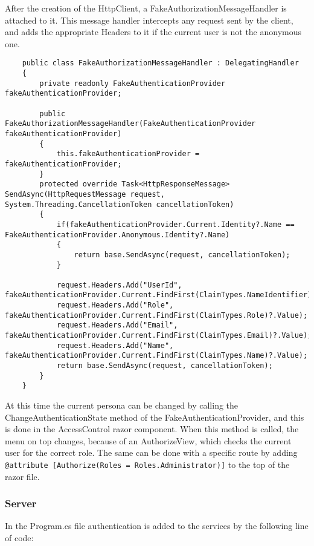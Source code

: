 After the creation of the HttpClient, a FakeAuthorizationMessageHandler is attached to it. This message handler intercepts any request sent by the client, and adds the appropriate Headers to it if the current user is not the anonymous one.

\begin{verbatim}
    public class FakeAuthorizationMessageHandler : DelegatingHandler
    {
        private readonly FakeAuthenticationProvider fakeAuthenticationProvider;
        
        public FakeAuthorizationMessageHandler(FakeAuthenticationProvider fakeAuthenticationProvider)
        {
            this.fakeAuthenticationProvider = fakeAuthenticationProvider;
        }
        protected override Task<HttpResponseMessage> SendAsync(HttpRequestMessage request, System.Threading.CancellationToken cancellationToken)
        {
            if(fakeAuthenticationProvider.Current.Identity?.Name == FakeAuthenticationProvider.Anonymous.Identity?.Name)
            {
                return base.SendAsync(request, cancellationToken);
            }
            
            request.Headers.Add("UserId", fakeAuthenticationProvider.Current.FindFirst(ClaimTypes.NameIdentifier)?.Value);
            request.Headers.Add("Role", fakeAuthenticationProvider.Current.FindFirst(ClaimTypes.Role)?.Value);
            request.Headers.Add("Email", fakeAuthenticationProvider.Current.FindFirst(ClaimTypes.Email)?.Value);
            request.Headers.Add("Name", fakeAuthenticationProvider.Current.FindFirst(ClaimTypes.Name)?.Value);
            return base.SendAsync(request, cancellationToken);
        }
    }
\end{verbatim}

At this time the current persona can be changed by calling the ChangeAuthenticationState method of the FakeAuthenticationProvider, and this is done in the AccessControl razor component. When this method is called, the menu on top changes, because of an AuthorizeView, which checks the current user for the correct role. The same can be done with a specific route by adding \texttt{@attribute [Authorize(Roles = Roles.Administrator)]} to the top of the razor file.

\subsubsection{Server}

In the Program.cs file authentication is added to the services by the following line of code:

